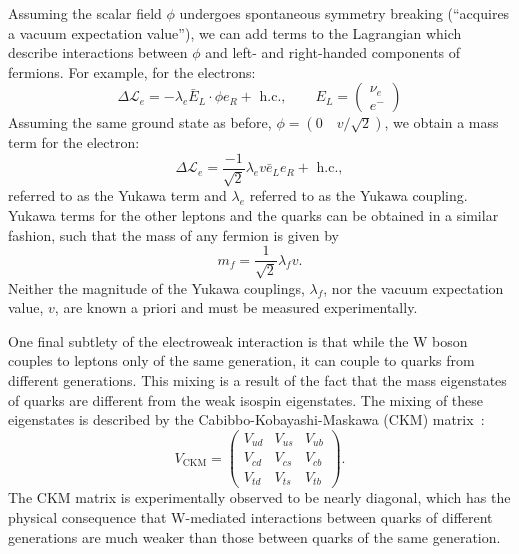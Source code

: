 Assuming the scalar field $\phi$ undergoes spontaneous symmetry breaking (``acquires a vacuum expectation value''), we can add terms to the Lagrangian which describe interactions between $\phi$ and left- and right-handed components of fermions.
For example, for the electrons:
\begin{equation}
\Delta \mathcal L_e = - \lambda_e \bar{E}_L \cdot \phi e_R + \text{ h.c.}, \qquad E_L = \begin{pmatrix} \nu_e \\ e^- \end{pmatrix} 
\end{equation}
Assuming the same ground state as before, $\phi = (0 \quad v/\sqrt{2})$, we obtain a mass term for the electron:
\begin{equation}
    \Delta \mathcal L_e = \frac{-1}{\sqrt{2}} \lambda_e v \bar{e}_L e_R + \text{ h.c.},
\end{equation}
referred to as the Yukawa term and $\lambda_e$ referred to as the Yukawa coupling.
Yukawa terms for the other leptons and the quarks can be obtained in a similar fashion, such that the mass of any fermion is given by
\begin{equation}
    m_f = \frac{1}{\sqrt{2}} \lambda_f v.
\end{equation}
Neither the magnitude of the Yukawa couplings, $\lambda_f$, nor the vacuum expectation value, $v$, are known a priori and must be measured experimentally.

One final subtlety of the electroweak interaction is that while the W boson couples to leptons only of the same generation, it can couple to quarks from different generations.
This mixing is a result of the fact that the mass eigenstates of quarks are different from the weak isospin eigenstates.
The mixing of these eigenstates is described by the Cabibbo-Kobayashi-Maskawa (CKM) matrix~\cite{Cabibbo:1963yz,Kobayashi:1973fv}:
\begin{equation}
V_{\text{CKM}} = \begin{pmatrix} V_{ud} & V_{us} & V_{ub} \\ V_{cd} & V_{cs} & V_{cb} \\ V_{td} & V_{ts} & V_{tb} \end{pmatrix}.
\end{equation}
The CKM matrix is experimentally observed to be nearly diagonal, which has the physical consequence that W-mediated interactions between quarks of different generations are much weaker than those between quarks of the same generation. 

